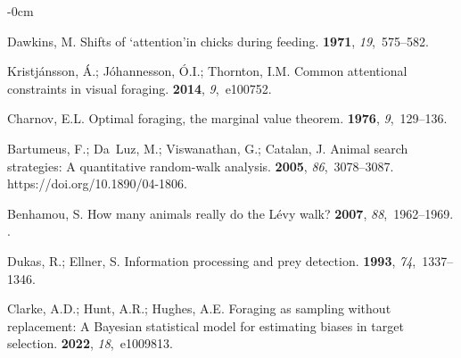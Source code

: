 \documentclass[vision,article,accept,pdftex,moreauthors]{Definitions/mdpi}
\begin{document}
\begin{adjustwidth}{-\extralength}{0cm}

\begin{thebibliography}{999}

Dawkins, M.
\newblock Shifts of ‘attention’in chicks during feeding.
 {\bf 1971}, {\em 19},~575--582.

Kristj{\'a}nsson, {\'A}.; J{\'o}hannesson, {\'O}.I.; Thornton, I.M.
\newblock Common attentional constraints in visual foraging.
 {\bf 2014}, {\em 9},~e100752.

Charnov, E.L.
\newblock Optimal foraging, the marginal value theorem.
 {\bf 1976}, {\em 9},~129--136.

Bartumeus, F.; Da~Luz, M.; Viswanathan, G.; Catalan, J.
\newblock Animal search strategies: A quantitative random-walk analysis.
 {\bf 2005}, {\em 86},~3078--3087.
\newblock 
  {{https://doi.org/10.1890/04-1806}}.

Benhamou, S.
\newblock How many animals really do the Lévy walk?
 {\bf 2007}, {\em 88},~1962--1969.
.

Dukas, R.; Ellner, S.
\newblock Information processing and prey detection.
 {\bf 1993}, {\em 74},~1337--1346.

Clarke, A.D.; Hunt, A.R.; Hughes, A.E.
\newblock Foraging as sampling without replacement: A Bayesian statistical
  model for estimating biases in target selection.
 {\bf 2022}, {\em 18},~e1009813.



\end{thebibliography}
\end{adjustwidth}
\end{document}
